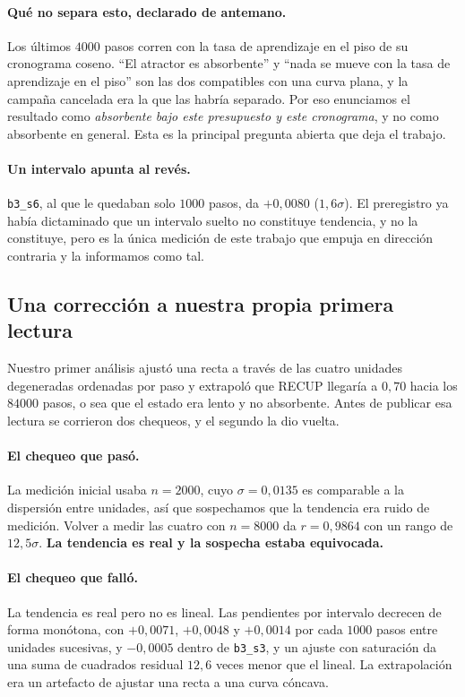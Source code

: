 \documentclass[11pt,a4paper]{article}
\begin{document}
\paragraph{Qué no separa esto, declarado de antemano.} Los últimos $4000$ pasos corren con la tasa de
aprendizaje en el piso de su cronograma coseno. ``El atractor es absorbente'' y ``nada se mueve con la
tasa de aprendizaje en el piso'' son las dos compatibles con una curva plana, y la campaña cancelada era
la que las habría separado. Por eso enunciamos el resultado como \emph{absorbente bajo este presupuesto
y este cronograma}, y no como absorbente en general. Esta es la principal pregunta abierta que deja el
trabajo.

\paragraph{Un intervalo apunta al revés.} \texttt{b3\_s6}, al que le quedaban solo $1000$ pasos, da
$+0{,}0080$ ($1{,}6\sigma$). El preregistro ya había dictaminado que un intervalo suelto no constituye
tendencia, y no la constituye, pero es la única medición de este trabajo que empuja en dirección
contraria y la informamos como tal.

\subsection{Una corrección a nuestra propia primera lectura}
\label{sec:correccion}

Nuestro primer análisis ajustó una recta a través de las cuatro unidades degeneradas ordenadas por paso
y extrapoló que RECUP llegaría a $0{,}70$ hacia los $84000$ pasos, o sea que el estado era lento y no
absorbente. Antes de publicar esa lectura se corrieron dos chequeos, y el segundo la dio vuelta.

\paragraph{El chequeo que pasó.} La medición inicial usaba $n=2000$, cuyo $\sigma = 0{,}0135$ es
comparable a la dispersión entre unidades, así que sospechamos que la tendencia era ruido de medición.
Volver a medir las cuatro con $n=8000$ da $r = 0{,}9864$ con un rango de $12{,}5\sigma$. \textbf{La
tendencia es real y la sospecha estaba equivocada.}

\paragraph{El chequeo que falló.} La tendencia es real pero no es lineal. Las pendientes por intervalo
decrecen de forma monótona, con $+0{,}0071$, $+0{,}0048$ y $+0{,}0014$ por cada $1000$ pasos entre
unidades sucesivas, y $-0{,}0005$ dentro de \texttt{b3\_s3}, y un ajuste con saturación da una suma de
cuadrados residual $12{,}6$ veces menor que el lineal. La extrapolación era un artefacto de ajustar una
recta a una curva cóncava.
\end{document}
